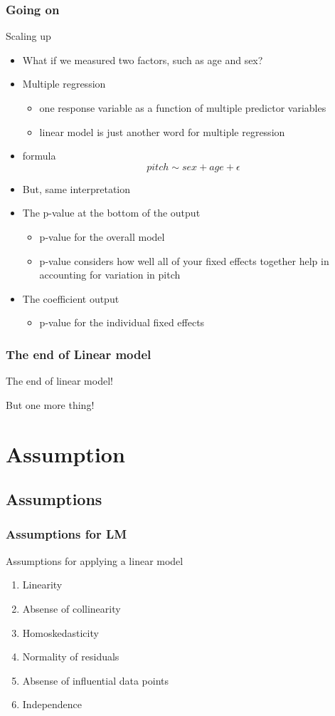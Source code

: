 \documentclass[10p]{beamer}\usepackage[]{graphicx}\usepackage[]{color}
\begin{document}
\begin{frame}
\frametitle{Going on}
Scaling up
\begin{itemize}
\item What if we measured two factors, such as age and sex?
\item Multiple regression
	\begin{itemize}
	\item one response variable as a function of multiple predictor variables
	\item linear model is just another word for multiple regression
	\end{itemize}
\item formula
\begin{displaymath}
pitch \sim sex + age + \epsilon
\end{displaymath}
\item But, same interpretation
\item The p-value at the bottom of the output
	\begin{itemize}
	\item p-value for the \alert{overall model}
	\item p-value considers how well all of your fixed effects together help in accounting for variation in pitch
	\end{itemize}
\item The coefficient output
	\begin{itemize}
	\item p-value for the individual fixed effects
	\end{itemize}
\end{itemize}
\end{frame}

\begin{frame}
\frametitle{The end of Linear model}
\centering
\Huge
The end of linear model!

But one more thing!
\end{frame}

\section{Assumption}
\subsection{Assumptions}
\begin{frame}
\frametitle{Assumptions for LM}
Assumptions for applying a linear model
\begin{enumerate}
\item Linearity
\item Absense of collinearity
\item Homoskedasticity
\item Normality of residuals
\item Absense of influential data points
\item Independence
\end{enumerate}
\end{frame}
\end{document}
